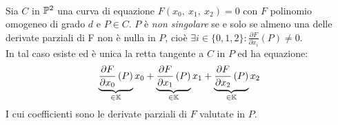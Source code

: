 \begin{proposition}~{}\\
	Sia $C$ in $\proj[2]{\ }$ una curva di equazione $F\left(x_0,\ x_1,\ x_2\right)=0$ con $F$ polinomio omogeneo di grado $d$ e $P\in C$. $P$ è \textit{non singolare} se e solo se almeno una delle derivate parziali di F non è nulla in $P$, cioè $\exists i\in\{0,1,2\}\colon \frac{\partial{F}}{\partial{x_i}}\left(P\right)\neq 0$.\\
	In tal caso esiste ed è unica la retta tangente a $C$ in $P$ ed ha equazione:
		\begin{equation}
			\underbrace{\frac{\partial{F}}{\partial{x_0}}\left(P\right) }_{\in\mathbb{K}}x_0 + \underbrace{\frac{\partial{F}}{\partial{x_1}}\left(P\right) }_{\in\mathbb{K}}x_1 + \underbrace{\frac{\partial{F}}{\partial{x_2}}\left(P\right) }_{\in\mathbb{K}}x_2
		\end{equation}
	I cui coefficienti sono le derivate parziali di $F$ valutate in $P$.
\end{proposition}
